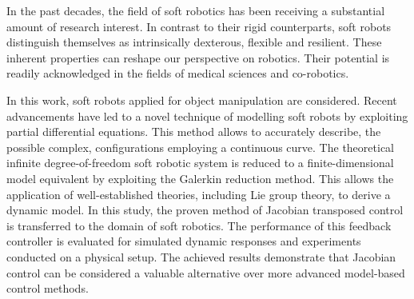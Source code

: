 In the past decades, the field of soft robotics has been receiving a substantial amount of research interest. In contrast to their rigid counterparts, soft robots distinguish themselves as intrinsically dexterous, flexible and resilient. These inherent properties can reshape our perspective on robotics. Their potential is readily acknowledged in the fields of medical sciences and co-robotics. 



In this work, soft robots applied for object manipulation are considered. Recent advancements have led to a novel technique of modelling soft robots by exploiting partial differential equations. This method allows to accurately describe, the possible complex, configurations employing a continuous curve. The theoretical infinite degree-of-freedom soft robotic system is reduced to a finite-dimensional model equivalent by exploiting the Galerkin reduction method. This allows the application of well-established theories, including Lie group theory, to derive a dynamic model. In this study, the proven method of Jacobian transposed control is transferred to the domain of soft robotics. The performance of this feedback controller is evaluated for simulated dynamic responses and experiments conducted on a physical setup. The achieved results demonstrate that Jacobian control can be considered a valuable alternative over more advanced model-based control methods.